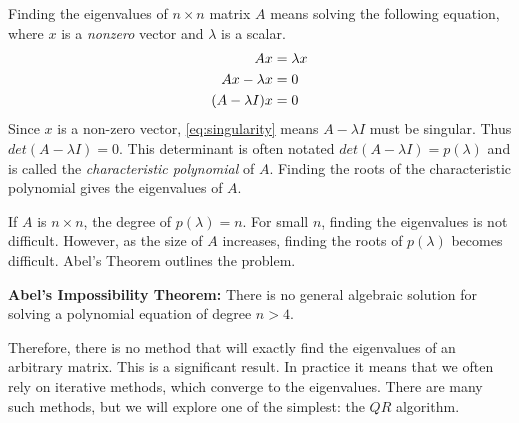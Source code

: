 \label{Ch:EigSolve}


Finding the eigenvalues of $n \times n$ matrix $A$ means solving the following equation, where $x$ is a \emph{nonzero} vector and $\lambda$ is a scalar.
\begin{align} 
 A x                       &=  \lambda x  \notag \\
A x - \lambda x &= 0 \notag \\
(A - \lambda I)x  &= 0 \label{eq:singularity}
\end{align}
Since $x$ is a non-zero vector, \eqref{eq:singularity} means $A-\lambda I$ must be singular. Thus $det(A-\lambda I) = 0$.  This determinant is often notated $det(A-\lambda I) = p(\lambda)$ and is called the \emph{characteristic polynomial} of $A$. Finding the roots of the characteristic polynomial gives the eigenvalues of $A$. 

If $A$ is $n \times n$, the degree of $p(\lambda) = n$.   For small $n$, finding the eigenvalues is not difficult.  However, as the size of $A$ increases, finding the roots of $p(\lambda)$ becomes difficult.  Abel's Theorem  outlines the problem.

\begin{theorem}
\label{Theorem:Abel}
{\bf Abel's Impossibility Theorem:} There is no general algebraic solution for solving a polynomial equation of degree $n>4$.
\end{theorem}

Therefore, there is no method that will exactly find the eigenvalues of an arbitrary matrix. This is a significant result. In practice it means that we often rely on iterative methods, which converge to the eigenvalues. There are many such methods, but we will explore one of the simplest: the $QR$ algorithm.

